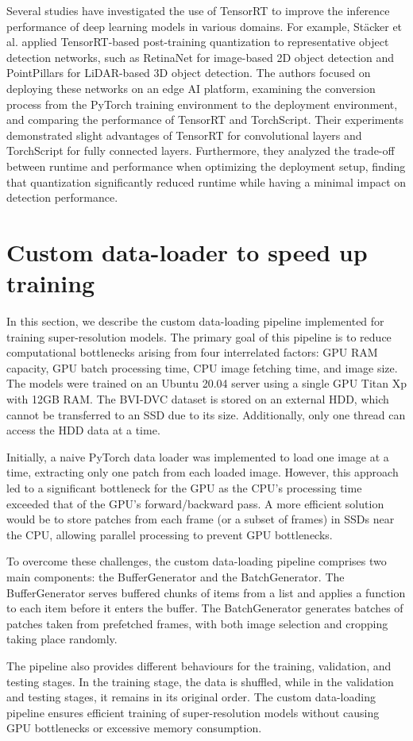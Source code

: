 Several studies have investigated the use of TensorRT to improve the inference performance of deep learning models in various domains. For example, St\"acker et al. \cite{stacker2021deployment} applied TensorRT-based post-training quantization to representative object detection networks, such as RetinaNet for image-based 2D object detection and PointPillars for LiDAR-based 3D object detection. The authors focused on deploying these networks on an edge AI platform, examining the conversion process from the PyTorch training environment to the deployment environment, and comparing the performance of TensorRT and TorchScript. Their experiments demonstrated slight advantages of TensorRT for convolutional layers and TorchScript for fully connected layers. Furthermore, they analyzed the trade-off between runtime and performance when optimizing the deployment setup, finding that quantization significantly reduced runtime while having a minimal impact on detection performance.

\section{Custom data-loader to speed up training}
\label{sec:custom-dataloader}

In this section, we describe the custom data-loading pipeline implemented for training super-resolution models. The primary goal of this pipeline is to reduce computational bottlenecks arising from four interrelated factors: GPU RAM capacity, GPU batch processing time, CPU image fetching time, and image size. The models were trained on an Ubuntu 20.04 server using a single GPU Titan Xp with 12GB RAM. The BVI-DVC dataset is stored on an external HDD, which cannot be transferred to an SSD due to its size. Additionally, only one thread can access the HDD data at a time.

Initially, a naive PyTorch data loader was implemented to load one image at a time, extracting only one patch from each loaded image. However, this approach led to a significant bottleneck for the GPU as the CPU's processing time exceeded that of the GPU's forward/backward pass. A more efficient solution would be to store patches from each frame (or a subset of frames) in SSDs near the CPU, allowing parallel processing to prevent GPU bottlenecks.

To overcome these challenges, the custom data-loading pipeline comprises two main components: the BufferGenerator and the BatchGenerator. The BufferGenerator serves buffered chunks of items from a list and applies a function to each item before it enters the buffer. The BatchGenerator generates batches of patches taken from prefetched frames, with both image selection and cropping taking place randomly.

The pipeline also provides different behaviours for the training, validation, and testing stages. In the training stage, the data is shuffled, while in the validation and testing stages, it remains in its original order. The custom data-loading pipeline ensures efficient training of super-resolution models without causing GPU bottlenecks or excessive memory consumption.
